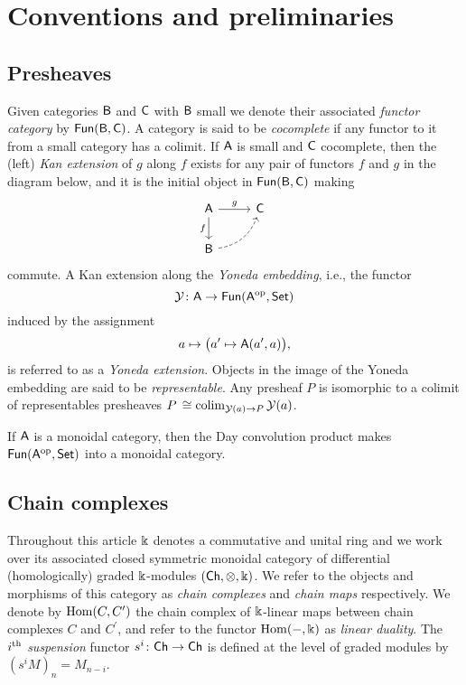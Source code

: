 
\section{Conventions and preliminaries}\label{s:preliminaries}

\subsection{Presheaves}

Given categories $\mathsf{B}$ and $\mathsf{C}$ with $\mathsf{B}$ small we denote their associated \textit{functor category} by $\mathsf{Fun}(\mathsf{B}, \mathsf{C})$.
A category is said to be \textit{cocomplete} if any functor to it from a small category has a colimit.
If $\mathsf{A}$ is small and $\mathsf{C}$ cocomplete, then the (left) \textit{Kan extension} of $g$ along $f$ exists for any pair of functors $f$ and $g$ in the diagram below, and it is the initial object in $\mathsf{Fun}(\mathsf{B}, \mathsf{C})$ making
\begin{equation*}
	\begin{tikzcd}[column sep=normal, row sep=normal]
		\sA \arrow[d, "f"'] \arrow[r, "g"] & \sC \\
		\sB \arrow[dashed, ur, bend right] & \quad
	\end{tikzcd}
\end{equation*}
commute.
A Kan extension along the \textit{Yoneda embedding}, i.e., the functor
\[
\operatorname{\mathcal{Y}} \colon \mathsf{A} \to \mathsf{Fun}(\mathsf{A}^{\mathrm{op}}, \mathsf{Set})
\]
induced by the assignment
\[
a \mapsto \big(a^\prime \mapsto \mathsf{A}(a^\prime, a)\big),
\]
is referred to as a \textit{Yoneda extension}.
Objects in the image of the Yoneda embedding are said to be \textit{representable}.
Any presheaf $P$ is isomorphic to a colimit of representables presheaves $P \, \cong \operatorname*{colim}_{\operatorname{\mathcal{Y}}(a) \to P} \operatorname{\mathcal{Y}}(a)$.

If $\mathsf{A}$ is a monoidal category, then the Day convolution product makes $\mathsf{Fun}(\mathsf{A}^{\mathrm{op}}, \mathsf{Set})$ into a monoidal category.

\subsection{Chain complexes}

Throughout this article $\Bbbk$ denotes a commutative and unital ring and we work over its associated closed symmetric monoidal category of differential (homologically) graded $\Bbbk$-modules $(\mathsf{Ch}, \otimes, \Bbbk)$.
We refer to the objects and morphisms of this category as \textit{chain complexes} and \textit{chain maps} respectively.
We denote by $\mathrm{Hom}(C, C^\prime)$ the chain complex of $\Bbbk$-linear maps between chain complexes $C$ and $C^\prime$, and refer to the functor $\mathrm{Hom}(-, \Bbbk)$ as \textit{linear duality}.
The $i^{\mathrm{th}}$ \textit{suspension} functor $s^i \colon \mathsf{Ch} \to \mathsf{Ch}$ is defined at the level of graded modules by $(s^{i}M)_n = M_{n-i}$.

